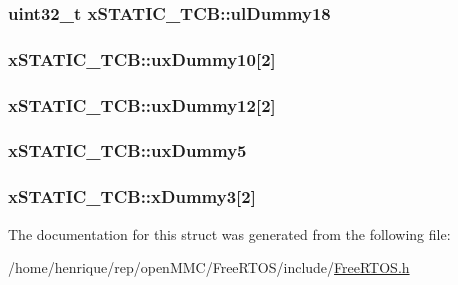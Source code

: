 \hypertarget{structxSTATIC__TCB_ade6781276f913dcd592ee0f6cce76c7e}{
\subsubsection[{ul\-Dummy18}]{\setlength{\rightskip}{0pt plus 5cm}uint32\-\_\-t x\-S\-T\-A\-T\-I\-C\-\_\-\-T\-C\-B\-::ul\-Dummy18}}\label{structxSTATIC__TCB_ade6781276f913dcd592ee0f6cce76c7e}
\hypertarget{structxSTATIC__TCB_ae5ff25c2fde1ad3c9a51bb45db81ac9f}{
\subsubsection[{ux\-Dummy10}]{ x\-S\-T\-A\-T\-I\-C\-\_\-\-T\-C\-B\-::ux\-Dummy10\mbox{[}2\mbox{]}}}\label{structxSTATIC__TCB_ae5ff25c2fde1ad3c9a51bb45db81ac9f}
\hypertarget{structxSTATIC__TCB_a4ebf548878e48d8b5232d1b8a1f789ab}{
\subsubsection[{ux\-Dummy12}]{ x\-S\-T\-A\-T\-I\-C\-\_\-\-T\-C\-B\-::ux\-Dummy12\mbox{[}2\mbox{]}}}\label{structxSTATIC__TCB_a4ebf548878e48d8b5232d1b8a1f789ab}
\hypertarget{structxSTATIC__TCB_ab950bb498901ef7291e49086e5a2efd0}{
\subsubsection[{ux\-Dummy5}]{ x\-S\-T\-A\-T\-I\-C\-\_\-\-T\-C\-B\-::ux\-Dummy5}}\label{structxSTATIC__TCB_ab950bb498901ef7291e49086e5a2efd0}
\hypertarget{structxSTATIC__TCB_a7f182aa8f5003494f63d975dabcb3ec1}{
\subsubsection[{x\-Dummy3}]{ x\-S\-T\-A\-T\-I\-C\-\_\-\-T\-C\-B\-::x\-Dummy3\mbox{[}2\mbox{]}}}\label{structxSTATIC__TCB_a7f182aa8f5003494f63d975dabcb3ec1}


The documentation for this struct was generated from the following file\-:\begin{DoxyCompactItemize}
\item 
/home/henrique/rep/open\-M\-M\-C/\-Free\-R\-T\-O\-S/include/\hyperlink{FreeRTOS_8h}{Free\-R\-T\-O\-S.\-h}\end{DoxyCompactItemize}
